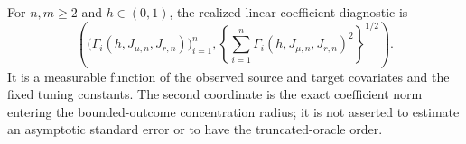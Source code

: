 For \(n,m\ge2\) and \(h\in(0,1)\), the realized linear-coefficient diagnostic is
\[
\left(
\bigl(\Gamma_i(h,J_{\mu,n},J_{r,n})\bigr)_{i=1}^n,
\left\{\sum_{i=1}^n\Gamma_i(h,J_{\mu,n},J_{r,n})^2\right\}^{1/2}
\right).
\]
It is a measurable function of the observed source and target covariates and the fixed tuning constants. The second coordinate is the exact coefficient norm entering the bounded-outcome concentration radius; it is not asserted to estimate an asymptotic standard error or to have the truncated-oracle order.